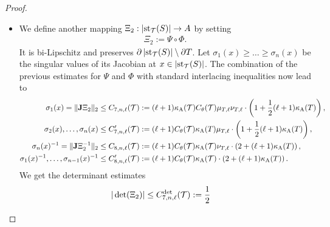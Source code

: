 \documentclass[10pt,a4paper]{article}
\begin{document}
\begin{proof}
\begin{itemize}
        
        \item 
        We define another mapping $ \Xi_{2} : \left| \operatorname{st}_{{\mathcal T}}(S) \right| \rightarrow A $ by setting 
        \begin{align*}
            \Xi_{2} := \Psi \circ \Phi.
        \end{align*}
        It is bi-Lipschitz and preserves $\partial\left| \operatorname{st}_{{\mathcal T}}(S) \right| \setminus \partial T$. 
        Let $\sigma_1(x) \geq \dots \geq \sigma_n(x)$ be the singular values of its Jacobian at $x \in \left| \operatorname{st}_{{\mathcal T}}(S) \right|$. 
        The combination of the previous estimates for $\Psi$ and $\Phi$ with standard interlacing inequalities now lead to 
        \begin{align*}
            \sigma_1(x)
            = 
            \|  {\mathbf{J}} \Xi_{2}  \|_{2}
            &\leq 
            C_{7,n,\ell}({\mathcal T})
            :=
            (\ell+1) 
            \kappa_{\rm A}({\mathcal T})
            C_\theta({\mathcal T})
            \mu_{T,\ell}
            \nu_{T,\ell}         
            \cdot 
            \left( 1 + \frac{1}{2} (\ell+1) \kappa_{\rm A}(T) \right)
            ,
            \\
            \sigma_2(x), \dots, \sigma_n(x) 
            &\leq 
            C'_{7,n,\ell}({\mathcal T})
            :=
            (\ell+1)
            C_\theta({\mathcal T})
            \kappa_{\rm A}(T)\mu_{T,\ell} 
            \cdot 
            \left( 1 + \frac{1}{2} (\ell+1) \kappa_{\rm A}(T) \right)
            ,
            \\
            \sigma_n(x)^{-1}
            = 
            \|  {\mathbf{J}} \Xi_{2}^{-1}  \|_{2}
            &\leq  
            C_{8,n,\ell}({\mathcal T})
            :=
            (\ell+1) 
            C_\theta({\mathcal T})
            \kappa_{\rm A}({\mathcal T})
            \nu_{T,\ell}           
            \cdot 
            \left( 2 + (\ell+1) \kappa_{\rm A}(T) \right)
            ,
            \\
            \sigma_1(x)^{-1}, \dots, \sigma_{n-1}(x)^{-1}
            &\leq 
            C'_{8,n,\ell}({\mathcal T})
            :=
            (\ell+1)
            C_\theta({\mathcal T})
            \kappa_{\rm A}({\mathcal T}) 
            \cdot 
            \left( 2 + (\ell+1) \kappa_{\rm A}(T) \right)
            .
        \end{align*}
        We get the determinant estimates 
        \begin{align*}
            |\det(\Xi_{2})|
            &\leq 
            \Cdetsieb{n}{\ell}(\calT)
            :=
            \frac 1 2 

\end{align*}
\end{itemize}
\end{proof}
\end{document}
